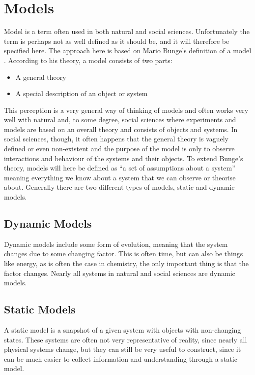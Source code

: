 \section{Models}
\label{sec:models}
Model is a term often used in both natural and social sciences. Unfortunately the term is perhaps not as well defined as it should be, and it will therefore be specified here. The approach here is based on Mario Bunge's definition of a model \cite{world_as_a_process}. According to his theory, a model consists of two parts:

\begin{itemize}
\item A general theory
\item A special description of an object or system
\end{itemize}

This perception is a very general way of thinking of models and often works very well with natural and, to some degree, social sciences where experiments and models are based on an overall theory and consists of objects and systems. In social sciences, though, it often happens that the general theory is vaguely defined or even non-existent and the purpose of the model is only to observe interactions and behaviour of the systems and their objects.
To extend Bunge's theory, models will here be defined as \enquote{a set of assumptions about a system} meaning everything we know about a system that we can observe or theorise about.
Generally there are two different types of models, static and dynamic models.


\subsection{Dynamic Models}
Dynamic models include some form of evolution, meaning that the system changes due to some changing factor. This is often time, but can also be things like energy, as is often the case in chemistry, the only important thing is that the factor changes. Nearly all systems in natural and social sciences are dynamic models.


\subsection{Static Models}
A static model is a snapshot of a given system with objects with non-changing states. These systems are often not very representative of reality, since nearly all physical systems change, but they can still be very useful to construct, since it can be much easier to collect information and understanding through a static model.


